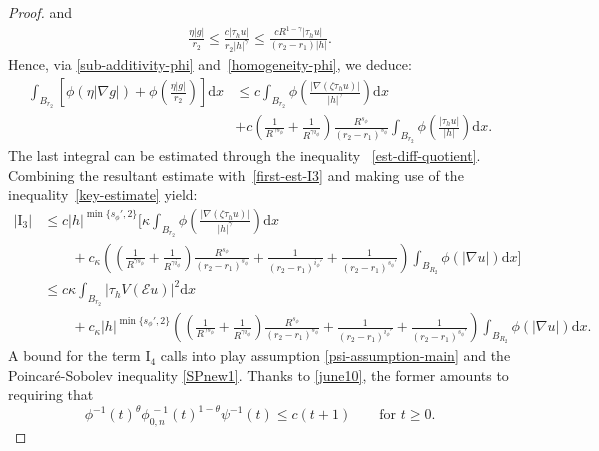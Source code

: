 \documentclass[leqno,11pt]{amsart}%
\numberwithin{equation}{section}
\def\d{\mathrm{d}}
\def\E{\mathcal{E}}
\def\dx{\d x}
\theoremstyle{definition}
\numberwithin{equation}{section}
\begin{document}
\begin{proof}
and
\begin{align*}
  \frac{\eta|g|}{{r_2}}
  \le
  \frac{c|\tau_hu|}{{r_2}|h|^\gamma}
  \le
  \frac{cR^{1-\gamma}|\tau_hu|}{(r_2-r_1)|h|}.
\end{align*}
Hence,  via \eqref{sub-additivity-phi} and~\eqref{homogeneity-phi}, we deduce:
\begin{align*}
  \int_{B_{r_2}}\left[\phi\left(\eta|\nabla g|\right)+\phi\left(\frac{\eta|g|}{{r_2}}\right)\right]\dx
  &\le
    c\int_{B_{r_2}}
    \phi\left(\frac{|\nabla (\zeta\tau_hu)|}{|h|^\gamma}\right) \dx\\\nonumber
    &+
     {c\left(\frac{1}{R^{\gamma s_\phi}}+\frac{1}{R^{\gamma i_\phi}}\right)\frac{R^{s_\phi}}{(r_2-r_1)^{s_\phi}}}\int_{B_{r_2}}
    \phi\left(\frac{|\tau_hu|}{|h|}\right) \dx.
\end{align*}
The last integral can be estimated through the inequality ~\eqref{est-diff-quotient}. Combining the resultant estimate
with~\eqref{first-est-I3} and making use of the
inequality~\eqref{key-estimate} yield:
  \begin{align}\label{est-I3}
    |\mathrm{I}_3|
    &\le
      c|h|^{\min\{s_\phi',2\}}
      \Bigg[\kappa
      \int_{B_{r_2}}
      \phi\left(\frac{|\nabla (\zeta\tau_hu)|}{|h|^\gamma}\right)\dx
     \\\nonumber &\qquad+
      c_\kappa\left( {\left(\frac{1}{R^{\gamma s_\phi}}+\frac{1}{R^{\gamma i_\phi}}\right)\frac{R^{s_\phi}}{(r_2-r_1)^{s_\phi}}}
      +
      \frac{1}{(r_2-r_1)^{i_\phi'}}
      +\frac{1}{(r_2-r_1)^{s_\phi'}}
      \right)
      \int_{B_{R_2}}\phi(|\nabla u|)\dx\Bigg]\\\nonumber
    &\le
      c\kappa\int_{B_{r_2}} |\tau_hV(\E u)|^2 \dx
      \\\nonumber &\qquad+
      c_\kappa|h|^{\min\{s_\phi',2\}}\left( {\left(\frac{1}{R^{\gamma s_\phi}}+\frac{1}{R^{\gamma i_\phi}}\right)\frac{R^{s_\phi}}{(r_2-r_1)^{s_\phi}}}
      +
      \frac{1}{(r_2-r_1)^{i_\phi'}}
      +\frac{1}{(r_2-r_1)^{s_\phi'}}
      \right)
      \int_{B_{R_2}}\phi(|\nabla u|)\dx.
  \end{align}
A bound for the term $\mathrm{I}_4$ calls into play assumption \eqref{psi-assumption-main} and the Poincar\'e-Sobolev inequality \eqref{SPnew1}. Thanks to \eqref{june10}, the former amounts to requiring that
\begin{equation}\label{psi-assumption''}
  \phi^{-1}(t)^{\theta}  \phi_{0,n}^{\,-1}(t)^{1-\theta} \psi^{-1}(t)\le  c(t + 1)
  \qquad\mbox{for}\,\, t\geq 0.
\end{equation}

\end{proof}
\end{document}
